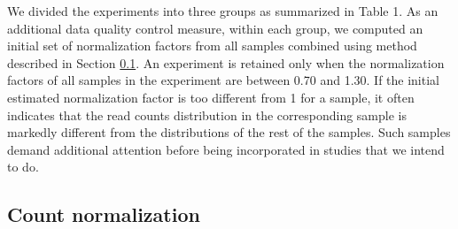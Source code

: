 \documentclass[11pt, a4paper]{article}
\begin{document}



We divided the experiments into three groups as summarized in Table 1.  As an
additional data quality control measure, within each group, we computed an
initial set of normalization factors from all samples combined using method
described in Section \ref{section:countNormalization}.  An experiment is
retained only when the normalization factors of all samples in the experiment
are between 0.70 and 1.30.  If the initial estimated normalization factor is
too different from 1 for a sample, it often indicates that the read counts
distribution in the corresponding sample is markedly different from the
distributions of the rest of the samples. Such samples demand additional
attention before being incorporated in studies that we intend to do.



\subsection{Count normalization}\label{section:countNormalization}
\end{document}
